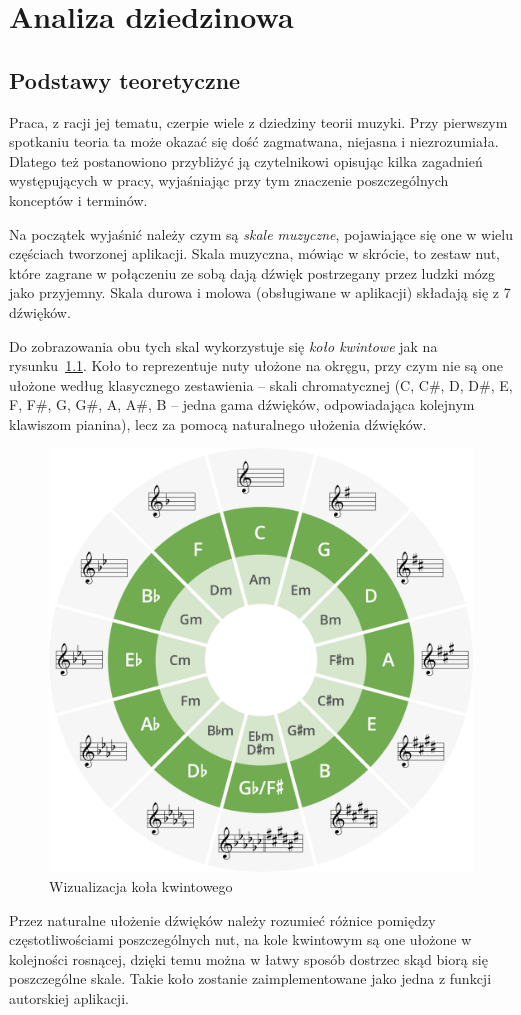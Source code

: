 \chapter{Analiza dziedzinowa}
\section{Podstawy teoretyczne}
Praca, z racji jej tematu, czerpie wiele z dziedziny teorii muzyki. Przy pierwszym spotkaniu teoria ta może okazać się dość zagmatwana, niejasna i niezrozumiała. Dlatego też postanowiono przybliżyć ją czytelnikowi opisując kilka zagadnień występujących w pracy, wyjaśniając przy tym znaczenie poszczególnych konceptów i terminów. 

Na początek wyjaśnić należy czym są \emph{skale muzyczne}, pojawiające się one w wielu częściach tworzonej aplikacji. Skala muzyczna, mówiąc w skrócie, to zestaw nut, które zagrane w połączeniu ze sobą dają dźwięk postrzegany przez ludzki mózg jako przyjemny. Skala durowa i molowa (obsługiwane w aplikacji) składają się z 7 dźwięków. 

Do zobrazowania obu tych skal wykorzystuje się \emph{koło kwintowe} jak na rysunku~\ref{fig:kolokwintylowe}. 
Koło to reprezentuje nuty ułożone na okręgu, przy czym nie są one ułożone według klasycznego zestawienia -- skali chromatycznej (C, C\#, D, D\#, E, F, F\#, G, G\#, A, A\#, B -- jedna gama dźwięków, odpowiadająca kolejnym klawiszom pianina), lecz za pomocą naturalnego ułożenia dźwięków. 
\begin{figure}[b]
	\centering
	\includegraphics[width=.48\linewidth]{rys02/cof2.1}
	\caption{Wizualizacja koła kwintowego} \label{fig:kolokwintylowe}
\end{figure}
Przez naturalne ułożenie dźwięków należy rozumieć różnice pomiędzy częstotliwościami poszczególnych nut, na kole kwintowym są one ułożone w kolejności rosnącej, dzięki temu można w łatwy sposób dostrzec skąd biorą się poszczególne skale. Takie koło zostanie zaimplementowane jako jedna z funkcji autorskiej aplikacji.


